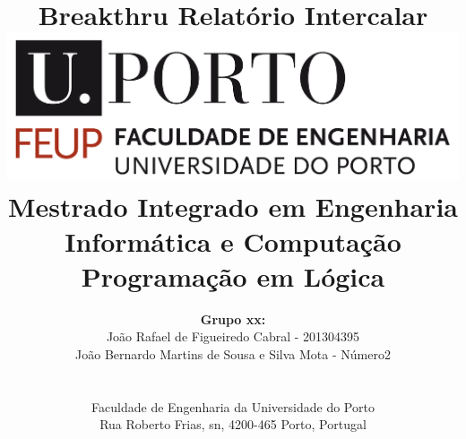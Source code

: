 \documentclass[a4paper]{article}
\begin{document}
\setlength{\textwidth}{16cm}
\setlength{\textheight}{22cm}

\title{\Huge\textbf{Breakthru}\linebreak\linebreak\linebreak
\Large\textbf{Relatório Intercalar}\linebreak\linebreak
\linebreak\linebreak
\includegraphics[scale=0.1]{feup-logo.png}\linebreak\linebreak
\linebreak\linebreak
\Large{Mestrado Integrado em Engenharia Informática e Computação} \linebreak\linebreak
\Large{Programação em Lógica}\linebreak
}

\author{\textbf{Grupo xx:}\\
João Rafael de Figueiredo Cabral - 201304395 \\
João Bernardo Martins de Sousa e Silva Mota - Número2 \\
\linebreak\linebreak \\
 \\ Faculdade de Engenharia da Universidade do Porto \\ Rua Roberto Frias, s\/n, 4200-465 Porto, Portugal \linebreak\linebreak\linebreak
\linebreak\linebreak\vspace{1cm}}

\maketitle
\thispagestyle{empty}
\end{document}

